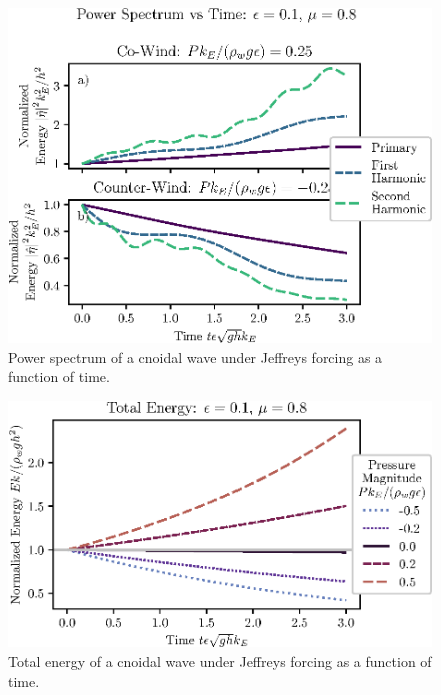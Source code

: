 \documentclass{jfm}
\begin{document}
\begin{figure}
  \centering
  \includegraphics{Power-Spectrum-vs-Time-Jeffreys.eps}
  \caption{
    Power spectrum of a cnoidal wave under Jeffreys forcing as a function
    of time.
  }
\end{figure}

\begin{figure}
  \centering
  \includegraphics{Total-Energy-Jeffreys.eps}
  \caption{
    Total energy of a cnoidal wave under Jeffreys forcing as a function
    of time.
  }
\end{figure}
\end{document}
